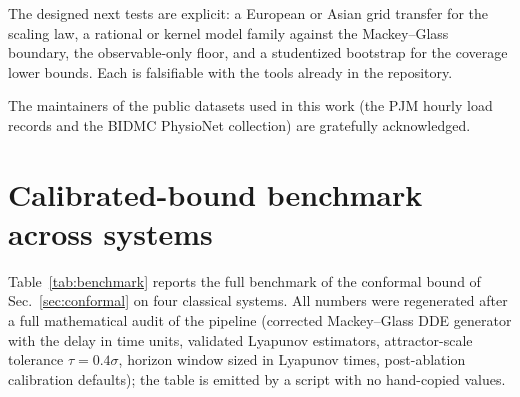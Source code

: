 \documentclass[aps,pre,twocolumn,superscriptaddress,nofootinbib,longbibliography]{revtex4-2}
\begin{document}
The designed next tests are explicit: a European or Asian grid transfer
for the scaling law, a rational or kernel model family against the
Mackey--Glass boundary, the observable-only floor, and a studentized
bootstrap for the coverage lower bounds. Each is falsifiable with the
tools already in the repository.

\begin{acknowledgments}
The maintainers of the public datasets used in this work (the PJM hourly
load records and the BIDMC PhysioNet collection) are gratefully
acknowledged.
\end{acknowledgments}



\appendix

\section{Calibrated-bound benchmark across systems}
\label{app:benchmark}

Table~\ref{tab:benchmark} reports the full benchmark of the conformal
bound of Sec.~\ref{sec:conformal} on four classical systems. All numbers
were regenerated after a full mathematical audit of the pipeline
(corrected Mackey--Glass DDE generator with the delay in time units,
validated Lyapunov estimators, attractor-scale tolerance
$\tau = 0.4\sigma$, horizon window sized in Lyapunov times, post-ablation
calibration defaults); the table is emitted by a script with no
hand-copied values.
\end{document}

